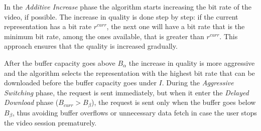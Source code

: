 \documentclass[openany]{book}
\begin{document}
In the \textit{Additive Increase} phase the algorithm starts increasing the bit rate of the video, if possible. The increase in quality is done step by step: if the current representation has a bit rate $r^{curr}$, the next one will have a bit rate that is the minimum bit rate, among the ones available, that is greater than $r^{curr}$. This approach ensures that the quality is increased gradually.

After the buffer capacity goes above $B_{\alpha}$ the increase in quality is more aggressive and the algorithm selects the representation with the highest bit rate that can be downloaded before the buffer capacity goes under $I$. During the \textit{Aggressive Switching} phase, the request is sent immediately, but when it enter the \textit{Delayed Download} phase ($B_{curr} > B_{\beta}$), the request is sent only when the buffer goes below $B_{\beta}$, thus avoiding buffer overflows or unnecessary data fetch in case the user stops the video session prematurely.
\end{document}

